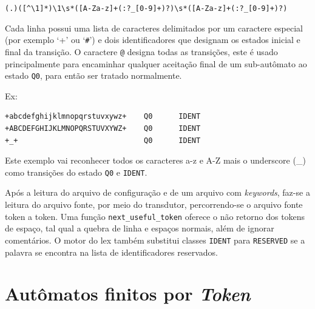 \verb!(.)([^\1]*)\1\s*([A-Za-z]+(:?_[0-9]+)?)\s*([A-Za-z]+(:?_[0-9]+)?)!

Cada linha possui uma lista de caracteres delimitados por um caractere
especial (por exemplo `+' ou `\verb!#!') e dois identificadores que designam os
estados inicial e final da transição. O caractere \verb!@! designa todas as
transições, este é usado principalmente para encaminhar qualquer aceitação
final de um sub-autômato ao estado \verb!Q0!, para então ser tratado
normalmente.

Ex:
\begin{lstlisting}
+abcdefghijklmnopqrstuvxywz+    Q0      IDENT
+ABCDEFGHIJKLMNOPQRSTUVXYWZ+    Q0      IDENT
+_+                             Q0      IDENT
\end{lstlisting}
Este exemplo vai reconhecer todos os caracteres a-z e A-Z mais o underscore
(\_) como transições do estado \verb!Q0! e \verb!IDENT!.

Após a leitura do arquivo de configuração e de um arquivo com
    \emph{keywords}, faz-se a leitura do arquivo fonte, por meio do
transdutor, percorrendo-se o arquivo fonte token a token. Uma função
\verb!next_useful_token! oferece o não retorno dos tokens de espaço, tal qual a
quebra de linha e espaços normais, além de ignorar comentários. O motor do lex também substitui classes
\verb!IDENT! para \verb!RESERVED! se a palavra se encontra na lista de
identificadores reservados. 

\section{Autômatos finitos por \emph{Token}}

